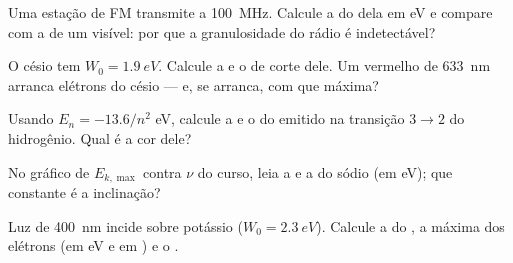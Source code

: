 \begin{exercise}[$\star$]\label{exo:g12:quantum-world:2}
Uma estação de FM transmite a \qty{100}{MHz}. Calcule a  do  dela em
\unit{eV} e compare com a de um  visível: por que a granulosidade do rádio é
indetectável?
\end{exercise}

\begin{exercise}[$\star$]\label{exo:g12:quantum-world:3}
O césio tem $W_0 = \qty{1.9}{eV}$. Calcule a  e o  de corte
dele. Um  vermelho de \qty{633}{nm} arranca elétrons do césio --- e, se arranca, com
que  máxima?
\end{exercise}

\begin{exercise}[$\star$]\label{exo:g12:quantum-world:4}
Usando $E_n = -13.6/n^2$ \unit{eV}, calcule a  e o  do 
emitido na transição $3 \to 2$ do hidrogênio. Qual é a cor dele?
\end{exercise}

\begin{exercise}[$\star$]\label{exo:g12:quantum-world:5}
No gráfico de $E_{k,\max}$ contra $\nu$ do curso, leia a  e a  do sódio (em \unit{eV}); que constante é a inclinação?
\end{exercise}

\begin{exercise}[$\star\star$]\label{exo:g12:quantum-world:6}
Luz de  \qty{400}{nm} incide sobre potássio
($W_0 = \qty{2.3}{eV}$). Calcule a  do , a  máxima dos
elétrons (em \unit{eV} e em ) e o .
\end{exercise}

